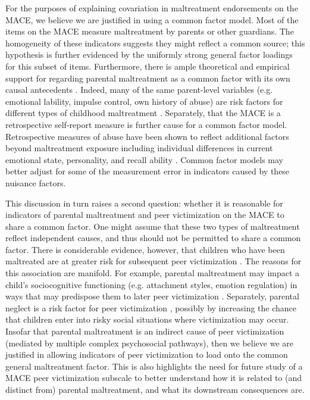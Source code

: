 \documentclass[letterpaper,man,natbib,noextraspace,floatsintext,longtable]{apa6}
\begin{document}
For the purposes of explaining covariation in maltreatment endorsements on the MACE, we believe we are justified in using a common factor model. Most of the items on the MACE measure maltreatment by parents or other guardians. The homogeneity of these indicators suggests they might reflect a common source; this hypothesis is further evidenced by the uniformly strong general factor loadings for this subset of items. Furthermore, there is ample theoretical and empirical support for regarding parental maltreatment as a common factor with its own causal antecedents . Indeed, many of the same parent-level variables (e.g. emotional lability, impulse control, own history of abuse) are risk factors for different types of childhood maltreatment . Separately, that the MACE is a retrospective self-report measure is further cause for a common factor model. Retrospective measures of abuse have been shown to reflect additional factors beyond maltreatment exposure including individual differences in current emotional state, personality, and recall ability . Common factor models may better adjust for some of the measurement error in indicators caused by these nuisance factors.

This discussion in turn raises a second question: whether it is reasonable for indicators of parental maltreatment and peer victimization on the MACE to share a common factor. One might assume that these two types of maltreatment reflect independent causes, and thus should not be permitted to share a common factor. There is considerable evidence, however, that children who have been maltreated are at greater risk for subsequent peer victimization . The reasons for this association are manifold. For example, parental maltreatment may impact a child's sociocognitive functioning (e.g. attachment styles, emotion regulation) in ways that may predispose them to later peer victimization . Separately, parental neglect is a risk factor for peer victimization , possibly by increasing the chance that children enter into risky social situations where victimization may occur. Insofar that parental maltreatment is an indirect cause of peer victimization (mediated by multiple complex psychosocial pathways), then we believe we are justified in allowing indicators of peer victimization to load onto the common general maltreatment factor. This is also highlights the need for future study of a MACE peer victimization subscale to better understand how it is related to (and distinct from) parental maltreatment, and what its downstream consequences are. 
\end{document}
